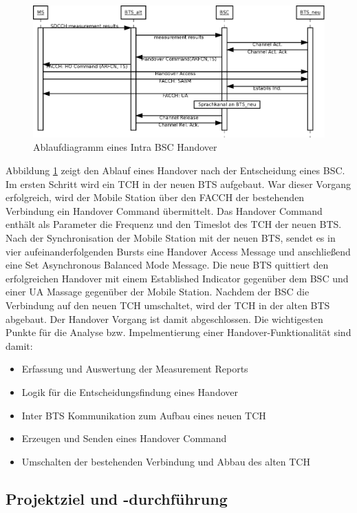 \begin{figure}[h!]
  \centering
  \includegraphics[width=\textwidth]{img/ablauf_handover}
  \caption{Ablaufdiagramm eines Intra BSC Handover \cite{bib:grundkursmks}}
  \label{fig:adhandover}
\end{figure}

Abbildung \ref{fig:adhandover} zeigt den Ablauf eines Handover nach der Entscheidung eines BSC. Im ersten Schritt wird ein TCH in der neuen BTS aufgebaut. War dieser Vorgang erfolgreich, wird der Mobile Station über den FACCH der bestehenden Verbindung ein Handover Command übermittelt. Das Handover Command enthält als Parameter die Frequenz und den Timeslot des TCH der neuen BTS. Nach der Synchronisation der Mobile Station mit der neuen BTS, sendet es in vier aufeinanderfolgenden Bursts eine Handover Access Message und anschließend eine Set Asynchronous Balanced Mode Message. Die neue BTS quittiert den erfolgreichen Handover mit einem Established Indicator gegenüber dem BSC und einer UA Massage gegenüber der Mobile Station. Nachdem der BSC die Verbindung auf den neuen TCH umschaltet, wird der TCH in der alten BTS abgebaut. Der Handover Vorgang ist damit abgeschlossen. Die wichtigesten Punkte für die Analyse bzw. Impelmentierung einer Handover-Funktionalität sind damit:

\begin{itemize}
 \item Erfassung und Auswertung der Measurement Reports
 \item Logik für die Entscheidungsfindung eines Handover
 \item Inter BTS Kommunikation zum Aufbau eines neuen TCH
 \item Erzeugen und Senden eines Handover Command
 \item Umschalten der bestehenden Verbindung und Abbau des alten TCH
\end{itemize}

\subsection{Projektziel und -durchführung}

